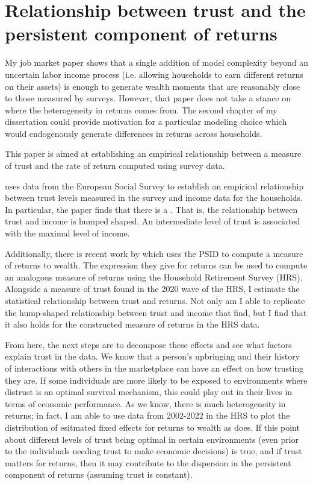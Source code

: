 \documentclass{scrartcl}
\begin{document}
\section{Relationship between trust and the persistent component of returns}

My job market paper shows that a single addition of model complexity beyond an uncertain labor income process (i.e. allowing households to earn different returns on their assets) is enough to generate wealth moments that are reasonably close to those measured by surveys. However, that paper does not take a stance on where the heterogeneity in returns comes from. The second chapter of my dissertation could provide motivation for a particular modeling choice which would endogenously generate differences in returns across households. 

This paper is aimed at establishing an empirical relationship between a measure of trust and the rate of return computed using survey data.

\cite{jbpglg2016} uses data from the European Social Survey to establish an empirical relationship between trust levels measured in the survey and income data for the households. 
In particular, the paper finds that there is a . That is, the relationship between trust and income is humped shaped. 
An intermediate level of trust is associated with the maximal level of income. 

Additionally, there is recent work by \cite{Daminato2024} which uses the PSID to compute a measure of returns to wealth. The expression they give for returns can be used to compute an analogous measure of returns using the Household Retirement Survey (HRS). Alongside a measure of trust found in the 2020 wave of the HRS, I estimate the statistical relationship between trust and returns. Not only am I able to replicate the hump-shaped relationship between trust and income that \cite{jbpglg2016} find, but I find that it also holds for the constructed measure of returns in the HRS data.

From here, the next steps are to decompose these effects and see what factors explain trust in the data. We know that a person's upbringing and their history of interactions with others in the marketplace can have an effect on how trusting they are. If some individuals are more likely to be exposed to environments where distrust is an optimal survival mechanism, this could play out in their lives in terms of economic performance. As we know, there is much heterogeneity in returns; in fact, I am able to use data from 2002-2022 in the HRS to plot the distribution of esitmated fixed effects for returns to wealth as \cite{aflgdmlp20} does. If this point about different levels of trust being optimal in certain environments (even prior to the individuals needing trust to make economic decisions) is true, and if trust matters for returns, then it may contribute to the dispersion in the persistent component of returns (assuming trust is constant). 
\end{document}

